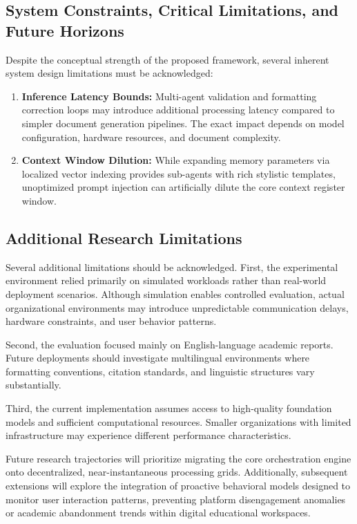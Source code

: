 \subsection{System Constraints, Critical Limitations, and Future Horizons}
Despite the conceptual strength of the proposed framework, several inherent system design limitations must be acknowledged:
\begin{enumerate}
\item \textbf{Inference Latency Bounds:} Multi-agent validation and formatting correction loops may introduce additional processing latency compared to simpler document generation pipelines. The exact impact depends on model configuration, hardware resources, and document complexity.
    \item \textbf{Context Window Dilution:} While expanding memory parameters via localized vector indexing provides sub-agents with rich stylistic templates, unoptimized prompt injection can artificially dilute the core context register window.
\end{enumerate}

\subsection{Additional Research Limitations}

Several additional limitations should be acknowledged. First, the experimental environment relied primarily on simulated workloads rather than real-world deployment scenarios. Although simulation enables controlled evaluation, actual organizational environments may introduce unpredictable communication delays, hardware constraints, and user behavior patterns.

Second, the evaluation focused mainly on English-language academic reports. Future deployments should investigate multilingual environments where formatting conventions, citation standards, and linguistic structures vary substantially.

Third, the current implementation assumes access to high-quality foundation models and sufficient computational resources. Smaller organizations with limited infrastructure may experience different performance characteristics.

Future research trajectories will prioritize migrating the core orchestration engine onto decentralized, near-instantaneous processing grids. Additionally, subsequent extensions will explore the integration of proactive behavioral models designed to monitor user interaction patterns, preventing platform disengagement anomalies or academic abandonment trends within digital educational workspaces.


